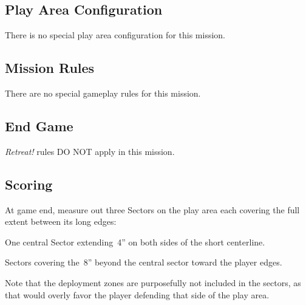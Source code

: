 \label{mission:frontline}

\subsection{Play Area Configuration}

There is no special play area configuration for this mission.

\subsection{Mission Rules}

There are no special gameplay rules for this mission.

\subsection{End Game}

\emph{Retreat!} rules DO NOT apply in this mission.


\subsection{Scoring}


  At game end, measure out three Sectors on the
play area each covering the full extent between its long edges:

\begin{squishitemize}
\item One central Sector extending~4'' on both sides of the short
  centerline.
\item Sectors covering the~8'' beyond the central sector toward the
  player edges.
\end{squishitemize}

\begin{recon}
  Note that the deployment zones are purposefully not included in the
  sectors, as that would overly favor the player defending that side
  of the play area.
\end{recon}

